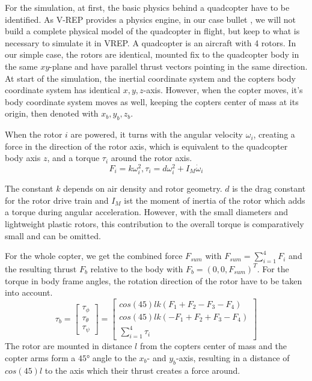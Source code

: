     
    For the simulation, at first, the basic physics behind a quadcopter have to be identified. 
    As V-REP provides a physics engine, in our case bullet \cite{bullet}, we will not build a complete physical model of the quadcopter in flight, but keep to what is necessary to simulate it in VREP.
    A quadcopter is an aircraft with 4 rotors. 
    In our simple case, the rotors are identical, mounted fix to the quadcopter body in the same $xy$-plane and have parallel thrust vectors pointing in the same direction. 
    At start of the simulation, the inertial coordinate system and the copters body coordinate system has identical $x,y,z$-axis. 
    However, when the copter moves, it's body coordinate system moves as well, keeping the copters center of mass at its origin, then denoted with $x_b, y_b, z_b$.
    
    When the rotor $i$ are powered, it turns with the angular velocity $\omega_i$, creating a force in the direction of the rotor axis, which is equivalent to the quadcopter body axis $z$, and a torque $\tau_i$ around the rotor axis.
    \begin{equation}
    F_i = k\omega_i^2, \tau_i = d\omega_i^2 + I_M\dot\omega_i
    \label{equ:forceAndTorque}
    \end{equation}
    
    The constant $k$ depends on air density and rotor geometry. $d$ is the drag constant for the rotor drive train and $I_M$ ist the moment of inertia of the rotor which adds a torque during angular acceleration. However, with the small diameters and lightweight plastic rotors, this contribution to the overall torque is comparatively small and can be omitted.
    
    For the whole copter, we get the combined force $F_{sum}$ with $F_{sum} = \sum_{i=1}^{4}{F_i}$ and the resulting thrust $F_b$ relative to the body with $F_b = (0, 0, F_{sum})^T$. For the torque in body frame angles, the rotation direction of the rotor have to be taken into account.
    \begin{equation}
    \tau_b =\begin{bmatrix}\tau_\phi \\ \tau_\theta \\ \tau_\psi \end{bmatrix} = \begin{bmatrix}cos(45)lk(F_1 + F_2 - F_3 - F_4) \\ cos(45)lk(-F_1 + F_2 + F_3  - F_4  ) \\ \sum_{i=1}^{4}{\tau_i} \end{bmatrix}
    \end{equation}
    The rotor are mounted in distance $l$ from the copters center of mass and the copter arms form a $\ang{45}$ angle to the $x_b$- and $y_b$-axis, resulting in a distance of $cos(45)l$ to the axis which their thrust creates a force around\cite{luukkonen2011modelling}.
    
